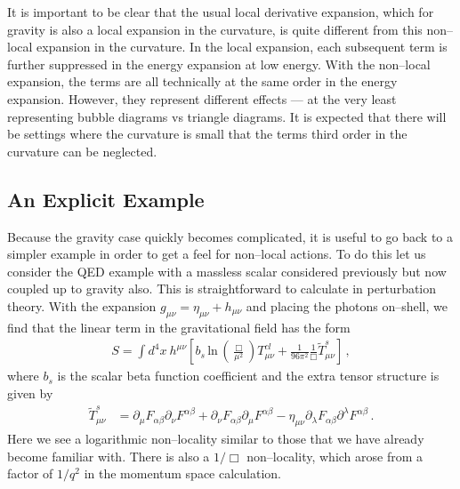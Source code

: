 \documentclass[11pt,a4paper]{article}
\begin{document}
It is important to be clear that the usual local derivative expansion, which for gravity is also a local expansion in the curvature, is quite different from this non--local expansion in the curvature. In the local expansion, each subsequent term is further suppressed in the energy expansion at low energy. With the non--local expansion, the terms are all technically at the same order in the energy expansion. However, they represent different effects --- at the very least representing bubble diagrams vs triangle diagrams. It is expected that there will be settings where the curvature is small that the terms third order in the curvature can be neglected.


\subsection{An Explicit Example}

Because the gravity case quickly becomes complicated, it is useful to go back to a simpler example in order to get a feel for non--local actions. To do this let us consider the QED example with a massless scalar considered previously but now coupled up to gravity also. This is straightforward to calculate in perturbation theory. With the expansion $g_{\mu\nu} = \eta_{\mu\nu}+h_{\mu\nu}$ and placing the photons on--shell, we find that the linear term in the gravitational field has the form
\begin{align}
S= \int d^4x ~h^{\mu\nu}\left[b_s\,\text{ln}\,  \left(\frac{\Box}{\mu^2}\right) T^{cl}_{\mu\nu}+ \frac{1}{96 \pi^2}\frac{1}{\Box} \tilde{T}^{s}_{\mu\nu}\right]\,,
\label{withsource}
\end{align}
where $b_s$ is the scalar beta function coefficient and the extra tensor structure is given by
\begin{align}
\tilde{T}^{s}_{\mu\nu} &= \partial_{\mu}F_{\alpha\beta}\partial_{\nu}F^{\alpha\beta} + \partial_{\nu}F_{\alpha\beta}\partial_{\mu}F^{\alpha\beta} - \eta_{\mu\nu}\partial_{\lambda}F_{\alpha\beta}\partial^{\lambda}F^{\alpha\beta}\,.
\end{align}
Here we see a logarithmic non--locality similar to those that we have already become familiar with. There is also a $1/\Box$ non--locality, which arose from a factor of $1/q^2$ in the momentum space calculation.
\end{document}
